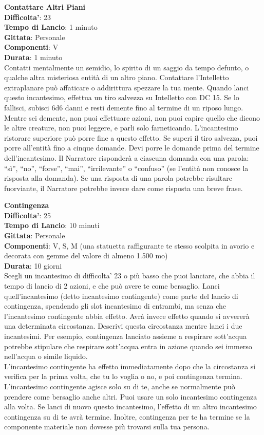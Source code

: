 \begin{multicols}{2}
\medskip\textbf{Contattare Altri Piani}\\
\textbf{Difficolta'}: 23\\
\textbf{Tempo di Lancio}: 1 minuto\\
\textbf{Gittata}: Personale\\
\textbf{Componenti}: V\\
\textbf{Durata}: 1 minuto\\
Contatti mentalmente un semidio, lo spirito di un saggio da tempo defunto, o qualche altra misteriosa entità di un altro piano. Contattare l’Intelletto extraplanare può affaticare o addirittura spezzare la tua mente. Quando lanci questo incantesimo, effettua un tiro salvezza su Intelletto con DC 15. Se lo fallisci, subisci 6d6 danni e resti demente fino al termine di un riposo lungo. Mentre sei demente, non puoi effettuare azioni, non puoi capire quello che dicono le altre creature, non puoi leggere, e parli solo farneticando. L’incantesimo ristorare superiore può porre fine a questo effetto. Se superi il tiro salvezza, puoi porre all’entità fino a cinque domande. Devi porre le domande prima del termine dell’incantesimo. Il Narratore risponderà a ciascuna domanda con una parola: “sì”, “no”, “forse”, “mai”, “irrilevante” o “confuso” (se l’entità non conosce la risposta alla domanda). Se una risposta di una parola
potrebbe risultare fuorviante, il Narratore potrebbe invece dare come risposta una breve frase.


\medskip\textbf{Contingenza}\\
\textbf{Difficolta'}: 25\\
\textbf{Tempo di Lancio}: 10 minuti\\
\textbf{Gittata}: Personale\\
\textbf{Componenti}: V, S, M (una statuetta raffigurante te stesso scolpita in avorio e decorata con gemme del valore di almeno 1.500 mo)\\
\textbf{Durata}: 10 giorni\\
Scegli un incantesimo di difficolta' 23 o più basso che puoi lanciare, che abbia il tempo di lancio di 2 azioni, e che può avere te come bersaglio. Lanci quell’incantesimo (detto incantesimo contingente) come parte del lancio di contingenza, spendendo gli slot incantesimo di entrambi, ma senza che l’incantesimo contingente abbia effetto. Avrà invece effetto quando si avvererà una determinata circostanza. Descrivi questa circostanza mentre lanci i due incantesimi. Per esempio, contingenza lanciato assieme a respirare sott’acqua potrebbe stipulare che respirare sott’acqua entra in azione quando sei immerso nell’acqua o simile liquido.\\
L’incantesimo contingente ha effetto immediatamente dopo che la circostanza si verifica per la prima volta, che tu lo voglia o no, e poi contingenza termina. L’incantesimo contingente agisce solo su di te, anche se normalmente può prendere come bersaglio anche altri. Puoi usare un solo incantesimo contingenza alla volta. Se lanci di nuovo questo incantesimo, l’effetto di un altro incantesimo contingenza su di te avrà termine. Inoltre, contingenza per te ha termine se la componente materiale non dovesse più trovarsi sulla tua persona.



\end{multicols}
